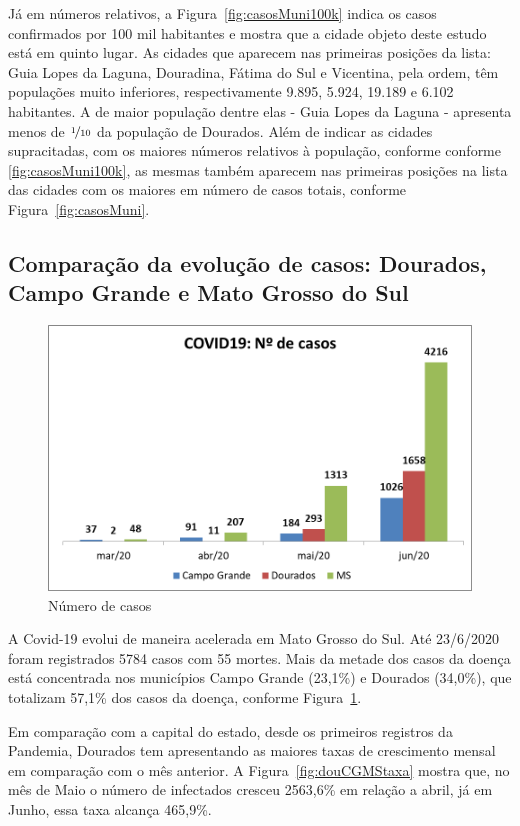 \documentclass[12pt]{article}
\begin{document}
Já em números relativos, a Figura~\ref{fig:casosMuni100k} indica os casos confirmados por 100 mil habitantes e mostra que a cidade objeto deste estudo está em quinto lugar. As cidades que aparecem nas primeiras posições da lista: Guia Lopes da Laguna, Douradina, Fátima do Sul e Vicentina, pela ordem, têm populações muito inferiores, respectivamente 9.895, 5.924, 19.189 e 6.102 habitantes. A de maior população dentre elas - Guia Lopes da Laguna - apresenta menos de \(\nicefrac{1}{10}\) da população de Dourados. Além de indicar as cidades supracitadas, com os maiores números relativos à população, conforme conforme \ref{fig:casosMuni100k}, as mesmas também aparecem nas primeiras posições na lista das cidades com os maiores em número de casos totais, conforme Figura~\ref{fig:casosMuni}.

\subsection{Comparação da evolução de casos: Dourados, Campo Grande e Mato Grosso do Sul}\label{ssec:DouCGMS}

\begin{figure}[!htb]
  \centering
  \includegraphics[width=.5\textwidth]{figs/douCGMS01.png}
  \caption{Número de casos}
  \label{fig:douCGMScasos}
  \end{figure}


A Covid-19 evolui de maneira acelerada em Mato Grosso do Sul. Até 23/6/2020 foram registrados 5784 casos com 55 mortes. Mais da metade dos casos da doença está concentrada nos municípios Campo Grande (23,1\%) e Dourados (34,0\%), que totalizam 57,1\% dos casos da doença, conforme Figura~\ref{fig:douCGMScasos}.


Em comparação com a capital do estado, desde os primeiros registros da Pandemia, Dourados tem apresentando as maiores taxas de crescimento mensal em comparação com o mês anterior. A Figura~\ref{fig:douCGMStaxa} mostra que, no mês de Maio o número de infectados cresceu 2563,6\% em relação a abril, já  em  Junho, essa taxa alcança 465,9\%.
\end{document}
